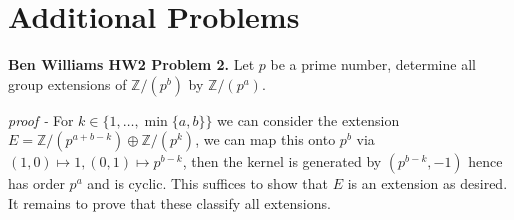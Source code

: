 \documentclass[11pt]{article}
\theoremstyle{definition}
\newcommand{\set}[1]{\{#1\}}
\begin{document}

    
    

















    \section{Additional Problems}

    \textbf{Ben Williams HW2 Problem 2.} Let \(p\) be a prime number, determine all group extensions of \(\mathbb{Z}/(p^b)\) by \(\mathbb{Z}/(p^a)\).

    \emph{proof - } For \(k \in \set{1,\hdots,\min\set{a,b}}\) we can consider the extension \(E = \mathbb{Z}/(p^{a + b - k}) \oplus \mathbb{Z}/(p^k)\), we can map this onto \(p^b\) via \((1,0) \mapsto 1, (0,1) \mapsto p^{b-k}\), then the kernel is generated by \((p^{b-k},-1)\) hence has order \(p^a\) and is cyclic. This suffices to show that \(E\) is an extension as desired. It remains to prove that these classify all extensions.
    
\end{document}
